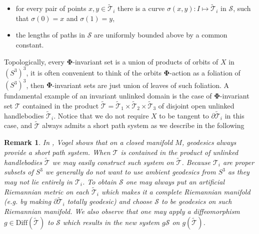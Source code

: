 \documentclass[12pt]{article}
\newtheorem{rem}[theorem]{Remark}
\newenvironment{remark}{\begin{rem} \rm}{\end{rem}}
\newcommand{\no}{\noindent}
\begin{document}
\begin{itemize}
\item[(a)] for every pair of points $x,y \in \widetilde{\mathcal{T}}_i$ there is a curve $\sigma(x,y):I\mapsto \widetilde{\mathcal{T}}_i$ in $\mathcal{S}$, such that $\sigma(0)=x$ and $\sigma(1)=y$,
\item[(b)] the lengths of paths in $\mathcal{S}$ are uniformly 
bounded above by a common constant. 
\end{itemize}


\no Topologically, every $\mathbf{\Phi}$-invariant 
set is a union of products of orbits of $X$ in $(S^3)^3$, it is often convenient to think of the 
orbits $\mathbf{\Phi}$-action as a foliation of $(S^3)^3$, then $\mathbf{\Phi}$-invariant 
sets are just union of leaves of such foliation.  A fundamental example of an 
invariant unlinked domain is the case of $\mathbf{\Phi}$-invariant 
set $\mathcal{T}$ contained in the product $\widetilde{\mathcal{T}}=\widetilde{\mathcal{T}}_1\times \widetilde{\mathcal{T}}_2\times \widetilde{\mathcal{T}}_3$ of disjoint open unlinked handlebodies $\widetilde{\mathcal{T}}_i$. Notice that we do not require $X$ to be tangent to $\partial\widetilde{\mathcal{T}}_i$ in this case, and $\widetilde{\mathcal{T}}$ always admits a short path system as we describe in the following

\begin{remark}
In \cite{Vogel03}, Vogel shows that on a closed manifold $M$, geodesics always provide a short path system. When $\mathcal{T}$ is contained in the product of unlinked handlebodies $\widetilde{\mathcal{T}}$
we may easily construct such system on $\widetilde{\mathcal{T}}$.
 Because  $\mathcal{\mathcal{T}}_i$ are proper subsets of $S^3$ we generally do not want to use ambient geodesics from $S^3$ as they may not lie entirely 
in $\mathcal{T}_i$. To obtain $\mathcal{S}$ one may always put an artificial Riemannian metric 
on each $\widetilde{\mathcal{T}}_i$ which makes it a complete Riemannian manifold (e.g. by making $\partial\widetilde{\mathcal{T}}_i$ totally geodesic) and choose $\mathcal{S}$ to be geodesics on such Riemannian manifold. We also observe that one may apply a diffeomorphism $g\in \text{Diff}(\widetilde{\mathcal{T}})$ to $\mathcal{S}$ 
which results in the new system $g\mathcal{S}$ on $g(\widetilde{\mathcal{T}})$.
\end{remark}
\end{document}
